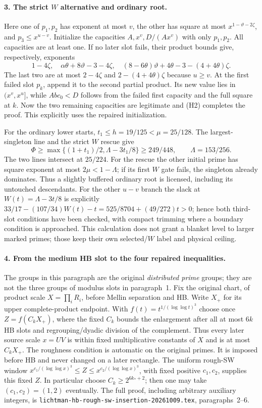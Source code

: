 \paragraph{3. The strict $W$ alternative and ordinary root.}
Here one of $p_1,p_2$ has exponent at most $v$, the other has square
at most $x^{1-\vartheta-2\zeta}$, and $p_3\le x^{u-v}$.
Initialize the capacities $A,x^v,D/(Ax^v)$ with only $p_1,p_2$.
All capacities are at least one. If no later slot fails, their product
bounds give, respectively, exponents
\[
 1-4\zeta,\quad \alpha\theta+8\vartheta-3-4\zeta,\quad
 (8-6\theta)\vartheta+4\theta-3-(4+4\theta)\zeta.
\]
The last two are at most $2-4\zeta$ and $2-(4+4\theta)\zeta$
because $u\ge v$. At the first failed slot $p_k$, append it to the
second partial product. Its new value lies in $(x^v,x^u]$, while
$Abc_0<D$ follows from the failed first capacity and the full square
at $k$. Now the two remaining capacities are legitimate and (H2)
completes the proof. This explicitly uses the repaired initialization.

For the ordinary lower starts, $t_1\le h=19/125<\mu=25/128$.
The largest-singleton line and the strict $W$ rescue give
\[
 \Phi\ge\max\{(1+t_1)/2,\Lambda-3t_1/8\}\ge249/448,
 \qquad\Lambda=153/256.
\]
The two lines intersect at $25/224$. For the rescue the other initial
prime has square exponent at most $2\mu<1-\Lambda$; if its first
$W$ gate fails, the singleton already dominates. Thus a slightly
buffered ordinary root is licensed, including its untouched descendants.
For the other $u-v$ branch the slack at $W(t)=\Lambda-3t/8$ is explicitly
$33/17-(107/34)W(t)-t=525/8704+(49/272)t>0$; hence both third-slot
conditions have been checked, with compact trimming where a boundary
condition is approached.
This calculation does not grant a blanket level to larger marked primes;
those keep their own selected/$W$ label and physical ceiling.

\paragraph{4. From the medium HB slot to the four repaired inequalities.}
The groups in this paragraph are the original \emph{distributed prime}
groups; they are not the three groups of modulus slots in paragraph~1.
Fix the original chart, of product scale $X=\prod_i R_i$, before
Mellin separation and HB. Write $X_+$ for its upper complete-product
endpoint. With $f(t)=t^{1/(\log\log t)^3}$ choose once
$Z=f(C_kX_+)$, where the fixed $C_k$ bounds the enlargement after all
at most $6k$ HB slots and regrouping/dyadic division of the complement.
Thus every later source scale $x=UV$ is within fixed multiplicative
constants of $X$ and is at most $C_kX_+$. The roughness condition is
automatic on the original primes. It is imposed before HB and never
changed on a later rectangle. The uniform rough-SW window
$x^{c_1/(\log\log x)^3}\le Z\le x^{c_2/(\log\log x)^3}$,
with fixed positive $c_1,c_2$, supplies this fixed $Z$.
In particular choose $C_k\ge2^{6k_*+2}$; then one may take
$(c_1,c_2)=(1,2)$ eventually. The full proof, including arbitrary
auxiliary integers, is
\texttt{lichtman-hb-rough-sw-insertion-20261009.tex}, paragraphs~2--6.

